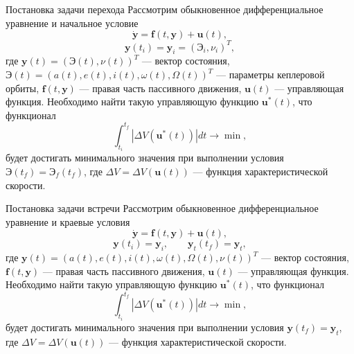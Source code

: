 \documentclass[9pt]{beamer}
\begin{document}
\begin{frame}{Постановка задачи перехода}
Рассмотрим обыкновенное дифференциальное уравнение и начальное условие
\begin{equation*}
    \dot{\mathbf{y}} = \mathbf{f}(t, \mathbf{y}) + \mathbf{u}(t),
\end{equation*}
\begin{equation*}
    \mathbf{y}(t_i) = \mathbf{y}_i = \left( \textbf{Э}_i, \nu_i \right)^T,
\end{equation*}
где $\mathbf{y}(t) = \left( \textbf{Э}(t), \nu(t) \right)^T$ --- вектор состояния, $\textbf{Э}(t)=\left( a(t), e(t), i(t), \omega(t), \Omega(t) \right)^T$ --- параметры кеплеровой орбиты, $\mathbf{f}(t, \mathbf{y})$ --- правая часть пассивного движения, $\mathbf{u}(t)$ --- управляющая функция. Необходимо найти такую управляющую функцию $\mathbf{u}^*(t)$, что функционал 
\begin{equation*}
    \int_{t_i}^{t_f} |\Delta V(\mathbf{u}^*(t))| dt \to \min,
\end{equation*}
будет достигать минимального значения при выполнении условия $\textbf{Э}(t_f)=\textbf{Э}_f(t_f)$, где $\Delta V = \Delta V(\mathbf{u}(t))$ --- функция характеристической скорости.
\end{frame}

\begin{frame}{Постановка задачи встречи}
Рассмотрим обыкновенное дифференциальное уравнение и краевые условия
\begin{equation*}
    \dot{\mathbf{y}} = \mathbf{f}(t, \mathbf{y}) + \mathbf{u}(t),
\end{equation*}
\begin{equation*}
    \mathbf{y}(t_i) = \mathbf{y}_i, \quad \quad \mathbf{y}_t(t_f) = \mathbf{y}_t,
\end{equation*}
где $\mathbf{y}(t) = \left( a(t), e(t), i(t), \omega(t), \Omega(t), \nu(t) \right)^T$ --- вектор состояния, $\mathbf{f}(t, \mathbf{y})$ --- правая часть пассивного движения, $\mathbf{u}(t)$ --- управляющая функция. Необходимо найти такую управляющую функцию $\mathbf{u}^*(t)$, что функционал 
\begin{equation*}
    \int_{t_i}^{t_f} |\Delta V(\mathbf{u}^*(t))| dt \to \min,
\end{equation*}
будет достигать минимального значения при выполнении условия $\mathbf{y} (t_f) = \mathbf{y}_t$, где $\Delta V = \Delta V(\mathbf{u}(t))$ --- функция характеристической скорости.
\end{frame}
\end{document}
